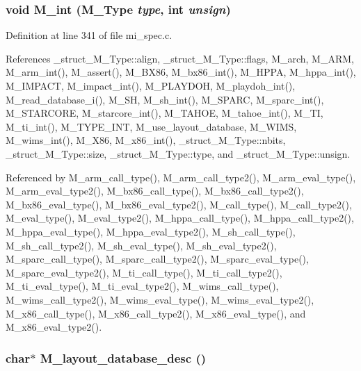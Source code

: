 \subsubsection{\setlength{\rightskip}{0pt plus 5cm}void M\_\-int (\bf{M\_\-Type} {\em type}, int {\em unsign})}\label{mi__spec_8c_c766b8ecea5e1faf092ce72af07e9af4}




Definition at line 341 of file mi\_\-spec.c.

References \_\-struct\_\-M\_\-Type::align, \_\-struct\_\-M\_\-Type::flags, M\_\-arch, M\_\-ARM, M\_\-arm\_\-int(), M\_\-assert(), M\_\-BX86, M\_\-bx86\_\-int(), M\_\-HPPA, M\_\-hppa\_\-int(), M\_\-IMPACT, M\_\-impact\_\-int(), M\_\-PLAYDOH, M\_\-playdoh\_\-int(), M\_\-read\_\-database\_\-i(), M\_\-SH, M\_\-sh\_\-int(), M\_\-SPARC, M\_\-sparc\_\-int(), M\_\-STARCORE, M\_\-starcore\_\-int(), M\_\-TAHOE, M\_\-tahoe\_\-int(), M\_\-TI, M\_\-ti\_\-int(), M\_\-TYPE\_\-INT, M\_\-use\_\-layout\_\-database, M\_\-WIMS, M\_\-wims\_\-int(), M\_\-X86, M\_\-x86\_\-int(), \_\-struct\_\-M\_\-Type::nbits, \_\-struct\_\-M\_\-Type::size, \_\-struct\_\-M\_\-Type::type, and \_\-struct\_\-M\_\-Type::unsign.

Referenced by M\_\-arm\_\-call\_\-type(), M\_\-arm\_\-call\_\-type2(), M\_\-arm\_\-eval\_\-type(), M\_\-arm\_\-eval\_\-type2(), M\_\-bx86\_\-call\_\-type(), M\_\-bx86\_\-call\_\-type2(), M\_\-bx86\_\-eval\_\-type(), M\_\-bx86\_\-eval\_\-type2(), M\_\-call\_\-type(), M\_\-call\_\-type2(), M\_\-eval\_\-type(), M\_\-eval\_\-type2(), M\_\-hppa\_\-call\_\-type(), M\_\-hppa\_\-call\_\-type2(), M\_\-hppa\_\-eval\_\-type(), M\_\-hppa\_\-eval\_\-type2(), M\_\-sh\_\-call\_\-type(), M\_\-sh\_\-call\_\-type2(), M\_\-sh\_\-eval\_\-type(), M\_\-sh\_\-eval\_\-type2(), M\_\-sparc\_\-call\_\-type(), M\_\-sparc\_\-call\_\-type2(), M\_\-sparc\_\-eval\_\-type(), M\_\-sparc\_\-eval\_\-type2(), M\_\-ti\_\-call\_\-type(), M\_\-ti\_\-call\_\-type2(), M\_\-ti\_\-eval\_\-type(), M\_\-ti\_\-eval\_\-type2(), M\_\-wims\_\-call\_\-type(), M\_\-wims\_\-call\_\-type2(), M\_\-wims\_\-eval\_\-type(), M\_\-wims\_\-eval\_\-type2(), M\_\-x86\_\-call\_\-type(), M\_\-x86\_\-call\_\-type2(), M\_\-x86\_\-eval\_\-type(), and M\_\-x86\_\-eval\_\-type2().
\subsubsection{\setlength{\rightskip}{0pt plus 5cm}char$\ast$ M\_\-layout\_\-database\_\-desc ()}\label{mi__spec_8c_d5392e7745470e33a59bf2e53d4929a9}




